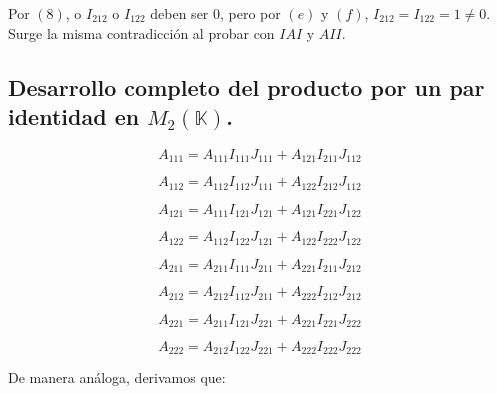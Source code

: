 \documentclass[a4paper, titlepage]{article}
\begin{document}
Por $(8)$, o $I_{212}$ o $I_{122}$ deben ser $0$, pero por $(e)$ y $(f)$, $I_{212} = I_{122} = 1 \neq 0$. Surge la misma contradicción al probar con $IAI$ y $AII$.

\subsection{Desarrollo completo del producto por un par identidad en $M_2 (\mathbb{K})$.}

\begin{equation}
A_{111} = A_{111} I_{111} J_{111} + A_{121} I_{211} J_{112}
\end{equation}

\begin{equation}
A_{112} = A_{112} I_{112} J_{111} + A_{122} I_{212} J_{112}
\end{equation}

\begin{equation}
A_{121} = A_{111} I_{121} J_{121} + A_{121} I_{221} J_{122}
\end{equation}

\begin{equation}
A_{122} = A_{112} I_{122} J_{121} + A_{122} I_{222} J_{122}
\end{equation}

\begin{equation}
A_{211} = A_{211} I_{111} J_{211} + A_{221} I_{211} J_{212}
\end{equation}

\begin{equation}
A_{212} = A_{212} I_{112} J_{211} + A_{222} I_{212} J_{212}
\end{equation}

\begin{equation}
A_{221} = A_{211} I_{121} J_{221} + A_{221} I_{221} J_{222}
\end{equation}

\begin{equation}
A_{222} = A_{212} I_{122} J_{221} + A_{222} I_{222} J_{222}
\end{equation}

De manera análoga, derivamos que:
\end{document}
